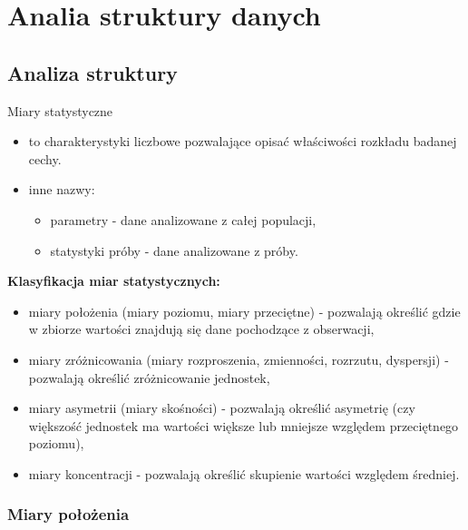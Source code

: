 \documentclass[
  polish,
  letterpaper,
  DIV=11,
  numbers=noendperiod]{scrreprt}
\providecommand{\tightlist}{%
  \setlength{\itemsep}{0pt}\setlength{\parskip}{0pt}}
\begin{document}
\part{Analia struktury danych}

\chapter{Analiza struktury}\label{analiza-struktury}

Miary statystyczne

\begin{itemize}
\tightlist
\item
  to charakterystyki liczbowe pozwalające opisać właściwości rozkładu
  badanej cechy.
\item
  inne nazwy:

  \begin{itemize}
  \tightlist
  \item
    parametry - dane analizowane z całej populacji,
  \item
    statystyki próby - dane analizowane z próby.
  \end{itemize}
\end{itemize}

\textbf{Klasyfikacja miar statystycznych:}

\begin{itemize}
\tightlist
\item
  miary położenia (miary poziomu, miary przeciętne) - pozwalają określić
  gdzie w zbiorze wartości znajdują się dane pochodzące z obserwacji,
\item
  miary zróżnicowania (miary rozproszenia, zmienności, rozrzutu,
  dyspersji) - pozwalają określić zróżnicowanie jednostek,
\item
  miary asymetrii (miary skośności) - pozwalają określić asymetrię (czy
  większość jednostek ma wartości większe lub mniejsze względem
  przeciętnego poziomu),
\item
  miary koncentracji - pozwalają określić skupienie wartości względem
  średniej.
\end{itemize}

\section{Miary położenia}\label{miary-poux142oux17cenia}
\end{document}
